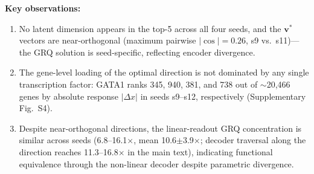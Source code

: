 \documentclass[11pt,a4paper]{article}
\begin{document}
\vspace{0.5cm}
\textbf{Key observations:}
\begin{enumerate}
\item No latent dimension appears in the top-5 across all four seeds, and the $\mathbf{v}^*$ vectors are near-orthogonal (maximum pairwise $|\cos| = 0.26$, s9 vs.\ s11)---the GRQ solution is seed-specific, reflecting encoder divergence.
\item The gene-level loading of the optimal direction is not dominated by any single transcription factor: GATA1 ranks 345, 940, 381, and 738 out of $\sim$20{,}466 genes by absolute response $|\Delta x|$ in seeds s9--s12, respectively (Supplementary Fig.~S4).
\item Despite near-orthogonal directions, the linear-readout GRQ concentration is similar across seeds (6.8--16.1$\times$, mean 10.6$\pm$3.9$\times$; decoder traversal along the direction reaches 11.3--16.8$\times$ in the main text), indicating functional equivalence through the non-linear decoder despite parametric divergence.
\end{enumerate}
\end{document}
